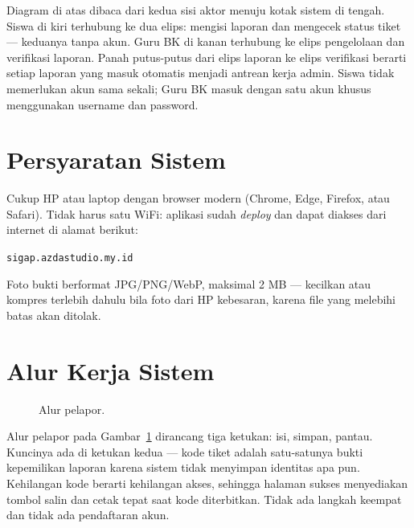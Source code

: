 \documentclass[12pt,a4paper]{article}
\begin{document}
Diagram di atas dibaca dari kedua sisi aktor menuju kotak sistem di tengah.
Siswa di kiri terhubung ke dua elips: mengisi laporan dan mengecek status
tiket --- keduanya tanpa akun. Guru BK di kanan terhubung ke elips pengelolaan
dan verifikasi laporan. Panah putus-putus dari elips laporan ke elips
verifikasi berarti setiap laporan yang masuk otomatis menjadi antrean kerja
admin. Siswa tidak memerlukan akun sama sekali; Guru BK masuk dengan satu akun
khusus menggunakan username dan password.

\section{Persyaratan Sistem}
Cukup HP atau laptop dengan browser modern (Chrome, Edge, Firefox, atau
Safari). Tidak harus satu WiFi: aplikasi sudah \textit{deploy} dan dapat
diakses dari internet di alamat berikut:
\begin{center}\texttt{sigap.azdastudio.my.id}\end{center}
Foto bukti berformat JPG/PNG/WebP, maksimal 2 MB --- kecilkan atau kompres
terlebih dahulu bila foto dari HP kebesaran, karena file yang melebihi batas
akan ditolak.

\section{Alur Kerja Sistem}
\begin{figure}[h]
\centering
{}
\caption{Alur pelapor.}
\label{fig:alurp}
\end{figure}

Alur pelapor pada Gambar~\ref{fig:alurp} dirancang tiga ketukan: isi, simpan,
pantau. Kuncinya ada di ketukan kedua --- kode tiket adalah satu-satunya bukti
kepemilikan laporan karena sistem tidak menyimpan identitas apa pun. Kehilangan
kode berarti kehilangan akses, sehingga halaman sukses menyediakan tombol salin
dan cetak tepat saat kode diterbitkan. Tidak ada langkah keempat dan tidak ada
pendaftaran akun.
\end{document}
